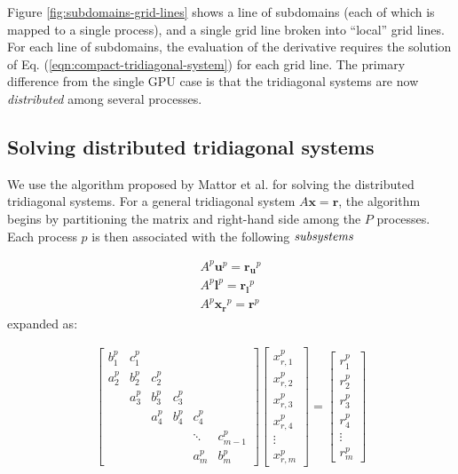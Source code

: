 \documentclass{elsarticle}
\begin{document}
Figure \ref{fig:subdomains-grid-lines}
shows a line of subdomains
(each of which is mapped to a single process),
and a single grid line
broken into ``local'' grid lines.
For each line of subdomains,
the evaluation of the derivative requires the solution
of Eq. (\ref{eqn:compact-tridiagonal-system})
for each grid line.
The primary difference from the single GPU case is that
the tridiagonal systems are now \emph{distributed}
among several processes.

\subsection{Solving distributed tridiagonal systems}

We use the algorithm
proposed by Mattor et al. \cite{mattor1995algorithm}
for solving the distributed tridiagonal systems.
For a general tridiagonal system $A\bm{x}=\bm{r}$,
the algorithm begins by partitioning
the matrix and right-hand side among the $P$ processes.
Each process $p$ is then associated with the
following $\emph{subsystems}$

\begin{align}
    & A^p\bm{u}^p = \bm{r_u}^p & \label{eqn:secondary-system-1} \\ 
    & A^p\bm{l}^p = \bm{r_l}^p & \label{eqn:secondary-system-2} \\
    & A^p\bm{x_r}^p = \bm{r}^p & \label{eqn:primary-system} 
\end{align}
%
expanded as:

\begin{align}
& \begin{bmatrix}
b_1^p & c_1^p \\
a_2^p & b_2^p & c_2^p \\
      & a_3^p & b_3^p & c_3^p \\
      &       & a_4^p & b_4^p & c_4^p \\
      &       &       &       &  \ddots & c_{m-1}^p\\
      &       &       &       &     a_{m}^p  & b_{m}^p
\end{bmatrix}
\begin{bmatrix}
x_{r,1}^p \\
x_{r,2}^p \\
x_{r,3}^p \\
x_{r,4}^p \\
\vdots \\
x_{r,m}^p
\end{bmatrix}
=
\begin{bmatrix}
r_1^p \\
r_2^p \\
r_3^p \\
r_4^p \\
\vdots \\
r_m^p
\end{bmatrix} & \label{eqn:primary-system-expanded} 
\end{align}
\end{document}
